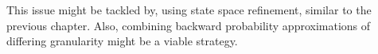 This issue might be tackled by, using state space refinement, similar
to the previous chapter.
Also, combining  backward probability approximations of differing
granularity might be a viable strategy.
